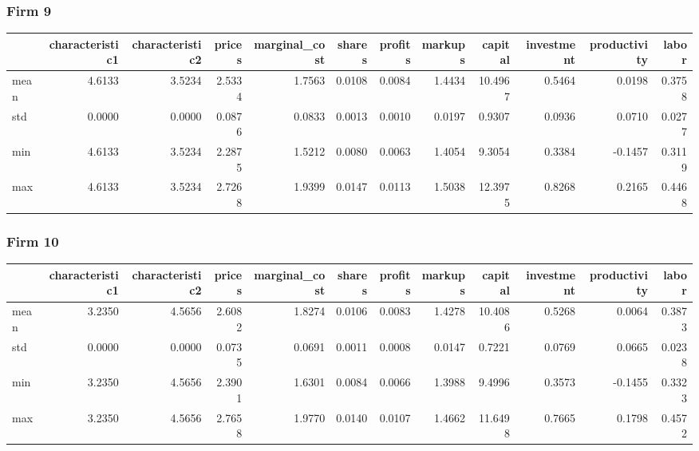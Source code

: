  \subsubsection*{Firm 9}
\begin{tabular}{lrrrrrrrrrrr}
\toprule
{} &  characteristic1 &  characteristic2 &  prices &  marginal\_cost &  shares &  profits &  markups &  capital &  investment &  productivity &  labor \\
\midrule
mean &           4.6133 &           3.5234 &  2.5334 &         1.7563 &  0.0108 &   0.0084 &   1.4434 &  10.4967 &      0.5464 &        0.0198 & 0.3758 \\
std  &           0.0000 &           0.0000 &  0.0876 &         0.0833 &  0.0013 &   0.0010 &   0.0197 &   0.9307 &      0.0936 &        0.0710 & 0.0277 \\
min  &           4.6133 &           3.5234 &  2.2875 &         1.5212 &  0.0080 &   0.0063 &   1.4054 &   9.3054 &      0.3384 &       -0.1457 & 0.3119 \\
max  &           4.6133 &           3.5234 &  2.7268 &         1.9399 &  0.0147 &   0.0113 &   1.5038 &  12.3975 &      0.8268 &        0.2165 & 0.4468 \\
\bottomrule
\end{tabular}


 \subsubsection*{Firm 10}
\begin{tabular}{lrrrrrrrrrrr}
\toprule
{} &  characteristic1 &  characteristic2 &  prices &  marginal\_cost &  shares &  profits &  markups &  capital &  investment &  productivity &  labor \\
\midrule
mean &           3.2350 &           4.5656 &  2.6082 &         1.8274 &  0.0106 &   0.0083 &   1.4278 &  10.4086 &      0.5268 &        0.0064 & 0.3873 \\
std  &           0.0000 &           0.0000 &  0.0735 &         0.0691 &  0.0011 &   0.0008 &   0.0147 &   0.7221 &      0.0769 &        0.0665 & 0.0238 \\
min  &           3.2350 &           4.5656 &  2.3901 &         1.6301 &  0.0084 &   0.0066 &   1.3988 &   9.4996 &      0.3573 &       -0.1455 & 0.3323 \\
max  &           3.2350 &           4.5656 &  2.7658 &         1.9770 &  0.0140 &   0.0107 &   1.4662 &  11.6498 &      0.7665 &        0.1798 & 0.4572 \\
\bottomrule
\end{tabular}


